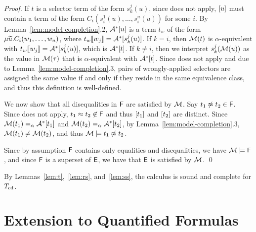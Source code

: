\begin{proof}
If $t$ is a selector term of the form $s^j_k( u )$,
since  does not apply, 
$[u]$ must contain a term of the form $C_i( s^1_i( u ), \ldots, s^{n}_i( u ) )$ for some $i$.
By Lemma~\ref{lem:model-completion}.2, $\mathcal{A}^\ast [u]$ is a term $t_w$ of the form
$\mu {\widetilde{u}}. C_i( w_1, \ldots, w_n )$,
where $t_w [\![  w_j  ]\!] = \mathcal{A}^\ast [ s^j_k( u )]$. 
If $k = i$, then $\mathcal{M}( t )$ is $\alpha$-equivalent with $t_w[\![ w_j ]\!] = \mathcal{A}^\ast [ s^j_k( u )]$,
which is $\mathcal{A}^\ast [t]$.
If $k \neq i$, then we interpret $s^j_k( \mathcal{M}( u ) )$ as the value in $\mathcal{M}( \tau )$ that is $\alpha$-equivalent with $\mathcal{A}^\ast [ t ]$.
Since  does not apply and due to Lemma~\ref{lem:model-completion}.3, 
pairs of wrongly-applied selectors are assigned the same value if and only if they reside in the same equivalence class,
and thus this definition is well-defined.

We now show that all disequalities in $\mathsf{F}$ are satisfied by $\mathcal{M}$.
Say $t_1 \not\approx t_2 \in \mathsf{F}$.
Since  does not apply, $t_1 \approx t_2 \not\in \mathsf{F}$ and thus $[t_1]$ and $[t_2]$ are distinct.
Since $\mathcal{M}( t_1 ) \mathrel{=_\alpha} \mathcal{A}^\ast [t_1]$ and $\mathcal{M}( t_2 ) \mathrel{=_\alpha} \mathcal{A}^\ast [t_2]$,
by Lemma~\ref{lem:model-completion}.3, $\mathcal{M}( t_1 ) \neq \mathcal{M}( t_2 )$, and thus $\mathcal{M} \models t_1 \not\approx t_2$.

Since by assumption $\mathsf{F}$ contains only equalities and disequalities, we have $\mathcal{M} \models \mathsf{F}$,
and since $\mathsf{F}$ is a superset of $\mathsf{E}$, we have that $\mathsf{E}$ is satisfied by $\mathcal{M}$.
\qed
\end{proof}

By Lemmas~\ref{lem:t},~\ref{lem:rs}, and~\ref{lem:ss}, the calculus is sound and complete for $T_{\mathrm{cd}}$.

\section{Extension to Quantified Formulas}
\label{sec:extension-to-quantified-formulas}

